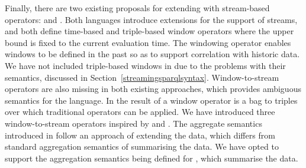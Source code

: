 Finally, there are two existing proposals for extending \sparql with stream-based operators: \streamingsparql \cite{Bolles_08} and \csparql \cite{Barbieri2010An-Execution-En}. 
Both languages introduce extensions for the support of \rdf streams, and both define time-based and triple-based window operators where the upper bound is fixed to the current evaluation time. 
The \sparqlstr windowing operator enables windows to be defined in the past so as to support correlation with historic data. 
We have not included triple-based windows in \sparqlstr due to the problems with their semantics, discussed in Section~\ref{streamingsparqlsyntax}.
Window-to-stream operators are also missing in both existing approaches, which provides ambiguous semantics for the language.
In \sparqlstr the result of a window operator is a bag to triples over which traditional operators can be applied.
We have introduced three window-to-stream operators inspired by \sneeql and \cql.
The aggregate semantics introduced in \csparql follow an approach of extending the data, which differs from standard aggregation semantics of summarising the data.
We have opted to support the aggregation semantics being defined for  \cite{Harris2010SPARQL-1.1-Quer}, which summarise the data.


